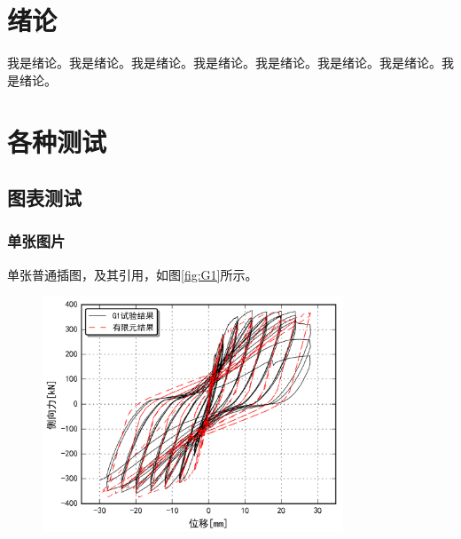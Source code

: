 \documentclass{bjtuthesis}
\begin{document}
\cover

\ccopyright

\setcounter{page}{1}

\cabspage
\eabspage
\pagestyle{myfancy}
\thispagestyle{myfancy}
\tableofcontents
\chapter{绪论}
\thispagestyle{myfancy}
\setcounter{page}{1}
我是绪论。我是绪论。我是绪论。我是绪论。我是绪论。我是绪论。我是绪论。我是绪论。
\chapter{各种测试}
\section{图表测试}
\subsection{单张图片}
单张普通插图，及其引用，如图\ref{fig:G1}所示。

\begin{figure}[!htp]
    \centering
    \includegraphics[width=0.8\textwidth]{pic/G1.png}
\end{figure}
\end{document}
